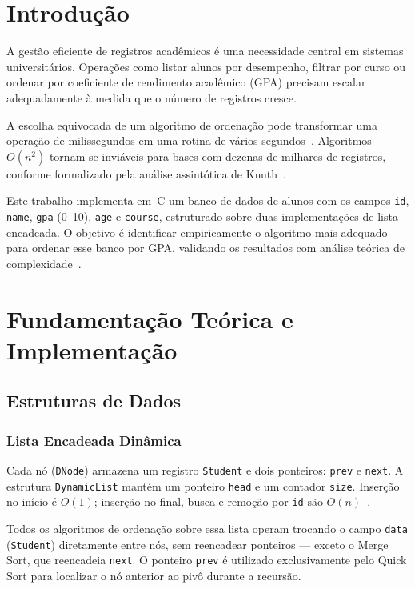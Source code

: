 \documentclass[conference]{IEEEtran}
\begin{document}
\section{Introdução}
\label{sec:intro}

A gestão eficiente de registros acadêmicos é uma necessidade central em
sistemas universitários. Operações como listar alunos por desempenho,
filtrar por curso ou ordenar por coeficiente de rendimento acadêmico (GPA)
precisam escalar adequadamente à medida que o número de registros cresce.

A escolha equivocada de um algoritmo de ordenação pode transformar uma
operação de milissegundos em uma rotina de vários segundos~\cite{cormen2022}.
Algoritmos $O(n^{2})$ tornam-se inviáveis para bases com dezenas de
milhares de registros, conforme formalizado pela análise assintótica
de Knuth~\cite{knuth1998}.

Este trabalho implementa em~C um banco de dados de alunos com os campos
\texttt{id}, \texttt{name}, \texttt{gpa} (0--10), \texttt{age} e
\texttt{course}, estruturado sobre duas implementações de lista encadeada.
O objetivo é identificar empiricamente o algoritmo mais adequado para
ordenar esse banco por GPA, validando os resultados com análise teórica
de complexidade~\cite{sedgewick2011}.

\section{Fundamentação Teórica e Implementação}
\label{sec:impl}

\subsection{Estruturas de Dados}

\subsubsection{Lista Encadeada Dinâmica}
Cada nó (\texttt{DNode}) armazena um registro \texttt{Student} e dois
ponteiros: \texttt{prev} e \texttt{next}. A estrutura \texttt{DynamicList}
mantém um ponteiro \texttt{head} e um contador \texttt{size}. Inserção
no início é $O(1)$; inserção no final, busca e remoção por \texttt{id}
são $O(n)$~\cite{cormen2022}.

Todos os algoritmos de ordenação sobre essa lista operam trocando o campo
\texttt{data} (\texttt{Student}) diretamente entre nós, sem reencadear
ponteiros --- exceto o Merge Sort, que reencadeia \texttt{next}.
O ponteiro \texttt{prev} é utilizado exclusivamente pelo Quick Sort para
localizar o nó anterior ao pivô durante a recursão.
\end{document}
